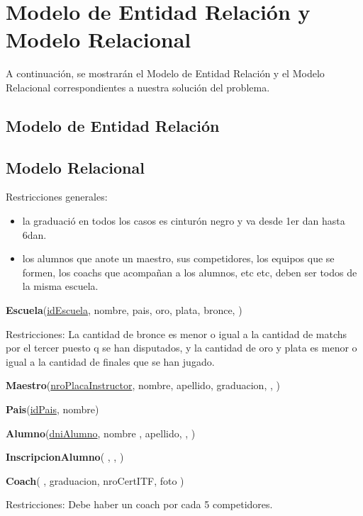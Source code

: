 \section{Modelo de Entidad Relación y Modelo Relacional}

A continuación, se mostrarán el Modelo de Entidad Relación y el Modelo Relacional correspondientes a nuestra solución del problema.

\subsection{Modelo de Entidad Relación}

\subsection{Modelo Relacional}

Restricciones generales:

\begin{itemize}

	\item la graduació en todos los casos es cinturón negro y va desde 1er dan hasta 6dan.
	\item los alumnos que anote un maestro, sus competidores, los equipos que se formen, los coachs que acompañan a los alumnos, etc etc, deben ser todos de la misma escuela.

\end{itemize}

\textbf{Escuela}(\uline{idEscuela}, nombre, pais, oro, plata, bronce, )

Restricciones: La cantidad de bronce es menor o igual a la cantidad de matchs por el tercer puesto q se han disputados, y la cantidad de oro y plata es menor o igual a la cantidad de finales que se han jugado.

\textbf{Maestro}(\uline{nroPlacaInstructor}, nombre, apellido, graduacion, , )

\textbf{Pais}(\uline{idPais}, nombre)

\textbf{Alumno}(\uline{dniAlumno}, nombre , apellido,  , )

\textbf{InscripcionAlumno}( ,  , )

\textbf{Coach}( , graduacion, nroCertITF, foto )

Restricciones: Debe haber un coach por cada 5 competidores.

